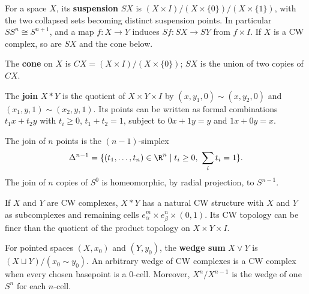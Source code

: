 \begin{definition}[Suspension]
\label{def:suspension}

For a space $X$, its \textbf{suspension} $SX$ is
$(X\times I)/(X\times\{0\})/(X\times\{1\})$, with the two collapsed sets becoming
distinct suspension points. In particular $SS^n\cong S^{n+1}$, and a map $f:X\to Y$
induces $Sf:SX\to SY$ from $f\times I$. If $X$ is a CW complex, so are $SX$ and
the cone below.
\end{definition}

\begin{definition}[Cone]
\label{def:cone}

The \textbf{cone} on $X$ is $CX=(X\times I)/(X\times\{0\})$; $SX$ is the union
of two copies of $CX$.
\end{definition}

\begin{definition}
\label{def:join}



The \textbf{join} $X*Y$ is the quotient of $X\times Y\times I$ by
$(x,y_1,0)\sim(x,y_2,0)$ and $(x_1,y,1)\sim(x_2,y,1)$. Its points can be written
as formal combinations $t_1x+t_2y$ with $t_i\ge0$, $t_1+t_2=1$, subject to
$0x+1y=y$ and $1x+0y=x$.
\end{definition}

\begin{definition}[Simplex]
\label{def:simplex}



The join of $n$ points is the $(n-1)$-simplex
\[
\Delta^{n-1}=\{(t_1,\ldots,t_n)\in\R^n\mid t_i\ge0,\ \sum_i t_i=1\}.
\]
The join of $n$ copies of $S^0$ is homeomorphic, by radial projection, to
$S^{n-1}$.
\end{definition}

If $X$ and $Y$ are CW complexes, $X*Y$ has a natural CW structure with $X$ and $Y$
as subcomplexes and remaining cells $e^m_\alpha\times e^n_\beta\times(0,1)$.
Its CW topology can be finer than the quotient of the product topology on
$X\times Y\times I$.

\begin{definition}
\label{def:wedge-sum}

For pointed spaces $(X,x_0)$ and $(Y,y_0)$, the \textbf{wedge sum} $X\vee Y$ is
$(X\sqcup Y)/(x_0\sim y_0)$. An arbitrary wedge of CW complexes is a CW complex
when every chosen basepoint is a $0$-cell. Moreover, $X^n/X^{n-1}$ is the wedge of
one $S^n$ for each $n$-cell.
\end{definition}

